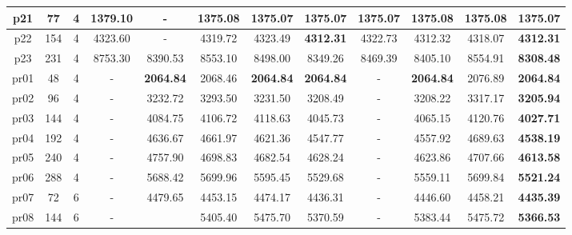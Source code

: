 \begin{table}[h!]
\begin{tabular}{|c|c|c|c|c|c|c|c|c|c|c|c|}
    p21      & 77  & 4  & 1379.10         & -                & 1375.08          & \textbf{1375.07} & \textbf{1375.07} & \textbf{1375.07} & 1375.08          & 1375.08          & \textbf{1375.07} \\\hline
    p22      & 154 & 4  & 4323.60         & -                & 4319.72          & 4323.49          & \textbf{4312.31} & 4322.73          & 4312.32          & 4318.07          & \textbf{4312.31} \\\hline
    p23      & 231 & 4  & 8753.30         & 8390.53          & 8553.10          & 8498.00          & 8349.26          & 8469.39          & 8405.10          & 8554.91          & \textbf{8308.48} \\\hline
    pr01     & 48  & 4  & -               & \textbf{2064.84} & 2068.46          & \textbf{2064.84} & \textbf{2064.84} & -                & \textbf{2064.84} & 2076.89          & \textbf{2064.84} \\\hline
    pr02     & 96  & 4  & -               & 3232.72          & 3293.50          & 3231.50          & 3208.49          & -                & 3208.22          & 3317.17          & \textbf{3205.94} \\\hline
    pr03     & 144 & 4  & -               & 4084.75          & 4106.72          & 4118.63          & 4045.73          & -                & 4065.15          & 4120.76          & \textbf{4027.71} \\\hline
    pr04     & 192 & 4  & -               & 4636.67          & 4661.97          & 4621.36          & 4547.77          & -                & 4557.92          & 4689.63          & \textbf{4538.19} \\\hline
    pr05     & 240 & 4  & -               & 4757.90          & 4698.83          & 4682.54          & 4628.24          & -                & 4623.86          & 4707.66          & \textbf{4613.58} \\\hline
    pr06     & 288 & 4  & -               & 5688.42          & 5699.96          & 5595.45          & 5529.68          & -                & 5559.11          & 5699.84          & \textbf{5521.24} \\\hline
    pr07     & 72  & 6  & -               & 4479.65          & 4453.15          & 4474.17          & 4436.31          & -                & 4446.60          & 4458.21          & \textbf{4435.39} \\\hline
    pr08     & 144 & 6  & -               &                  & 5405.40          & 5475.70          & 5370.59          & -                & 5383.44          & 5475.72          & \textbf{5366.53} \\\hline

\end{tabular}
\end{table}
